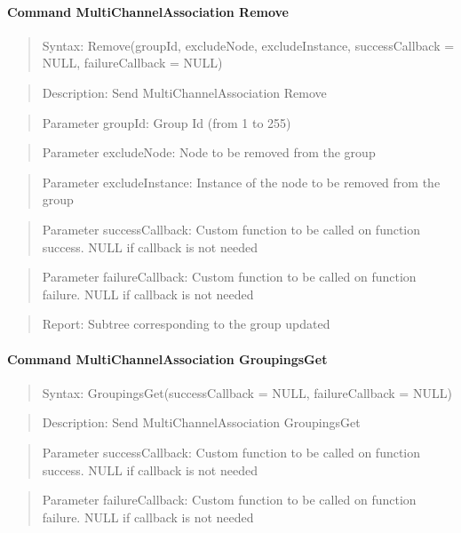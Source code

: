 \paragraph{Command MultiChannelAssociation Remove}
\begin{quote}Syntax: Remove(groupId, excludeNode, excludeInstance, successCallback = NULL, failureCallback = NULL)\end{quote}
\begin{quote}Description: Send MultiChannelAssociation Remove\end{quote}
\begin{quote}Parameter groupId: Group Id (from 1 to 255)\end{quote}
\begin{quote}Parameter excludeNode: Node to be removed from the group\end{quote}
\begin{quote}Parameter excludeInstance: Instance of the node to be removed from the group\end{quote}
\begin{quote}Parameter successCallback: Custom function to be called on function success. NULL if callback is not needed\end{quote}
\begin{quote}Parameter failureCallback: Custom function to be called on function failure. NULL if callback is not needed\end{quote}
\begin{quote}Report: Subtree corresponding to the group updated\end{quote}

\paragraph{Command MultiChannelAssociation GroupingsGet}
\begin{quote}Syntax: GroupingsGet(successCallback = NULL, failureCallback = NULL)\end{quote}
\begin{quote}Description: Send MultiChannelAssociation GroupingsGet\end{quote}
\begin{quote}Parameter successCallback: Custom function to be called on function success. NULL if callback is not needed\end{quote}
\begin{quote}Parameter failureCallback: Custom function to be called on function failure. NULL if callback is not needed\end{quote}



